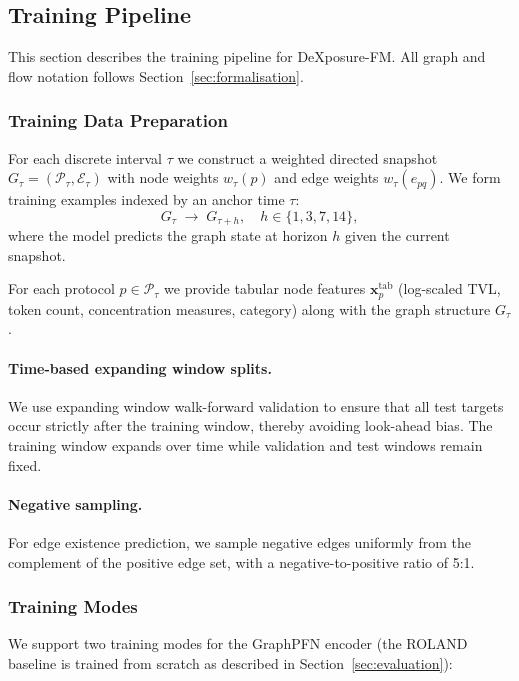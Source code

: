 \subsection{Training Pipeline}
\label{sec:training}

This section describes the training pipeline for DeXposure-FM. All graph and flow notation follows Section~\ref{sec:formalisation}.

\subsubsection{Training Data Preparation}

For each discrete interval $\tau$ we construct a weighted directed snapshot $G_{\tau}=(\mathcal P_{\tau},\mathcal E_{\tau})$ with node weights $w_{\tau}(p)$ and edge weights $w_{\tau}(e_{pq})$. We form training examples indexed by an anchor time $\tau$:
\begin{equation}
G_{\tau} \;\longrightarrow\; G_{\tau+h}, \quad h \in \{1, 3, 7, 14\},
\end{equation}
where the model predicts the graph state at horizon $h$ given the current snapshot.

For each protocol $p\in\mathcal P_{\tau}$ we provide tabular node features $\mathbf x^{\mathrm{tab}}_{p}$ (log-scaled TVL, token count, concentration measures, category) along with the graph structure $G_{\tau}$.

\paragraph{Time-based expanding window splits.}
We use expanding window walk-forward validation to ensure that all test targets occur strictly after the training window, thereby avoiding look-ahead bias. The training window expands over time while validation and test windows remain fixed.

\paragraph{Negative sampling.}
For edge existence prediction, we sample negative edges uniformly from the complement of the positive edge set, with a negative-to-positive ratio of 5:1.

\subsubsection{Training Modes}

We support two training modes for the GraphPFN encoder (the ROLAND baseline is trained from scratch as described in Section~\ref{sec:evaluation}):

